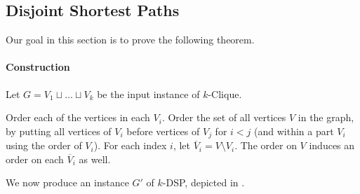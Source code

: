 \documentclass[11pt]{article}
\renewcommand{\bar}{\overline}
\theoremstyle{definition}
\begin{document}
\subsection{Disjoint Shortest Paths}

Our goal in this section is to prove the following theorem. 

\lbdspboth*



\paragraph{Construction}

Let $G = V_1\sqcup \dots\sqcup V_k$ be the input instance of \textsf{$k$-Clique}.

Order each of the vertices in each $V_i$.
Order the set of all vertices $V$ in the graph, by putting all vertices of $V_i$ before vertices of $V_j$ for $i < j$ (and within a part $V_i$ using the order of $V_i$).
For each index $i$, let $\bar{V}_i = V\setminus V_i$.
The order on $V$ induces an order on each $\bar{V}_i$ as well.

We now produce an instance $G'$ of \textsf{$k$-DSP}, depicted in .
\end{document}

